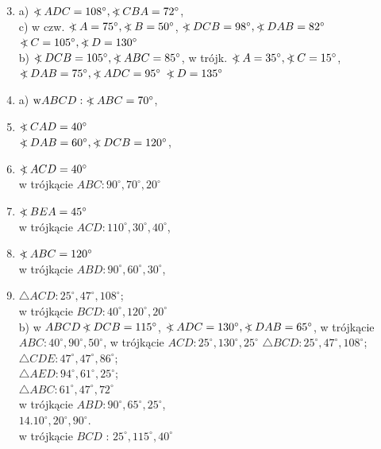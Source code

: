 \documentclass[10pt]{article}
\newcommand\Varangle{\mathop{{<\!\!\!\!\!\text{\small)}}\:}\nolimits}
\begin{document}
\begin{enumerate}
  \setcounter{enumi}{2}
  \item a) \(\Varangle A D C=108^{\circ}, \Varangle C B A=72^{\circ}\),\\
c) w czw. \(\Varangle A=75^{\circ}, \Varangle B=50^{\circ}\), \(\Varangle D C B=98^{\circ}, \Varangle D A B=82^{\circ}\) \(\Varangle C=105^{\circ}, \Varangle D=130^{\circ}\)\\
b) \(\Varangle D C B=105^{\circ}, \Varangle A B C=85^{\circ}\), w trójk. \(\Varangle A=35^{\circ}, \Varangle C=15^{\circ}\), \(\Varangle D A B=75^{\circ}, \Varangle A D C=95^{\circ}\) \(\Varangle D=135^{\circ}\)
  \item a) \(\mathrm{w} A B C D: \Varangle A B C=70^{\circ}\),
  \item \(\Varangle C A D=40^{\circ}\)\\
\(\Varangle D A B=60^{\circ}, \Varangle D C B=120^{\circ}\),
  \item \(\Varangle A C D=40^{\circ}\)\\
w trójkącie \(A B C: 90^{\circ}, 70^{\circ}, 20^{\circ}\)
  \item \(\Varangle B E A=45^{\circ}\)\\
w trójkącie \(A C D: 110^{\circ}, 30^{\circ}, 40^{\circ}\),
  \item \(\Varangle A B C=120^{\circ}\)\\
w trójkącie \(A B D: 90^{\circ}, 60^{\circ}, 30^{\circ}\),
  \item \(\triangle A C D: 25^{\circ}, 47^{\circ}, 108^{\circ}\);\\
w trójkącie \(B C D: 40^{\circ}, 120^{\circ}, 20^{\circ}\)\\
b) w \(A B C D \Varangle D C B=115^{\circ}\), \(\Varangle A D C=130^{\circ}, \Varangle D A B=65^{\circ}\), w trójkącie \(A B C: 40^{\circ}, 90^{\circ}, 50^{\circ}\), w trójkącie \(A C D: 25^{\circ}, 130^{\circ}, 25^{\circ}\) \(\triangle B C D: 25^{\circ}, 47^{\circ}, 108^{\circ}\);\\
\(\triangle C D E: 47^{\circ}, 47^{\circ}, 86^{\circ}\);\\
\(\triangle A E D: 94^{\circ}, 61^{\circ}, 25^{\circ}\);\\
\(\triangle A B C: 61^{\circ}, 47^{\circ}, 72^{\circ}\)\\
w trójkącie \(A B D: 90^{\circ}, 65^{\circ}, 25^{\circ}\),\\
\(14.10^{\circ}, 20^{\circ}, 90^{\circ}\).\\
w trójkącie \(B C D\) : \(25^{\circ}, 115^{\circ}, 40^{\circ}\)

\end{enumerate}
\end{document}
